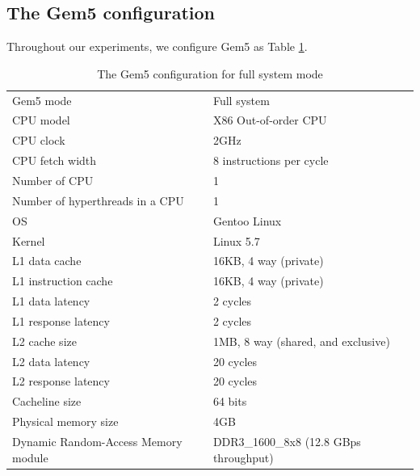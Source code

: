 \documentclass{iacrtrans}
\begin{document}
\subsection{The Gem5 configuration}
Throughout our experiments, we configure Gem5 as Table \ref{tab:gem5_config}.
\begin{table}[]
\begin{tabular}{ll}
Gem5 mode                           & Full system                            \\
CPU model                           & X86 Out-of-order CPU                   \\
CPU clock                           & 2GHz                                   \\
CPU fetch width                     & 8 instructions per cycle               \\
Number of CPU                       & 1                                      \\
Number of hyperthreads in a CPU     & 1                                      \\
OS                                  & Gentoo Linux                           \\
Kernel                              & Linux 5.7                              \\
L1 data cache                       & 16KB, 4 way (private)                  \\
L1 instruction cache                & 16KB, 4 way (private)                  \\
L1 data latency                     & 2 cycles                               \\
L1 response latency                 & 2 cycles                               \\
L2 cache size                       & 1MB, 8 way  (shared, and exclusive)    \\
L2 data latency                     & 20 cycles                              \\
L2 response latency                 & 20 cycles                              \\
Cacheline size                      & 64 bits                                \\
Physical memory size                & 4GB                                    \\
Dynamic Random-Access Memory module & DDR3\_1600\_8x8 (12.8 GBps throughput)
\end{tabular}
\caption{The Gem5 configuration for full system mode}
\label{tab:gem5_config}
\end{table}
\end{document}
